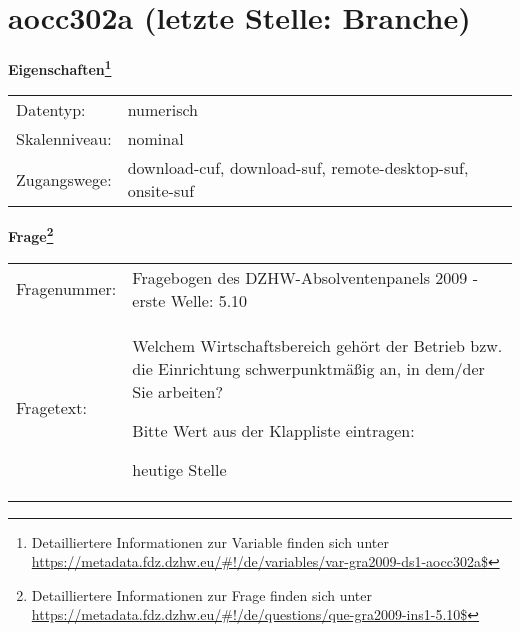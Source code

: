 
    \setcounter{footnote}{0}

    \vspace*{-1.8cm}
	\section{aocc302a (letzte Stelle: Branche)}
	\label{section:aocc302a}



    \vspace*{0.5cm}
    \noindent\textbf{Eigenschaften\footnote{Detailliertere Informationen zur Variable finden sich unter
		\url{https://metadata.fdz.dzhw.eu/\#!/de/variables/var-gra2009-ds1-aocc302a$}}}\\
	\begin{tabularx}{\hsize}{@{}lX}
	Datentyp: & numerisch \\
	Skalenniveau: & nominal \\
	Zugangswege: &
	  download-cuf, 
	  download-suf, 
	  remote-desktop-suf, 
	  onsite-suf
 \\
    \end{tabularx}



				\vspace*{0.5cm}
                \noindent\textbf{Frage\footnote{Detailliertere Informationen zur Frage finden sich unter
		              \url{https://metadata.fdz.dzhw.eu/\#!/de/questions/que-gra2009-ins1-5.10$}}}\\
				\begin{tabularx}{\hsize}{@{}lX}
					Fragenummer: &
					  Fragebogen des DZHW-Absolventenpanels 2009 - erste Welle:
					  5.10
 \\
					Fragetext: & Welchem Wirtschaftsbereich gehört der Betrieb bzw. die Einrichtung schwerpunktmäßig an, in dem/der Sie arbeiten?\par  Bitte Wert aus der Klappliste eintragen:\par  heutige Stelle \\
				\end{tabularx}





